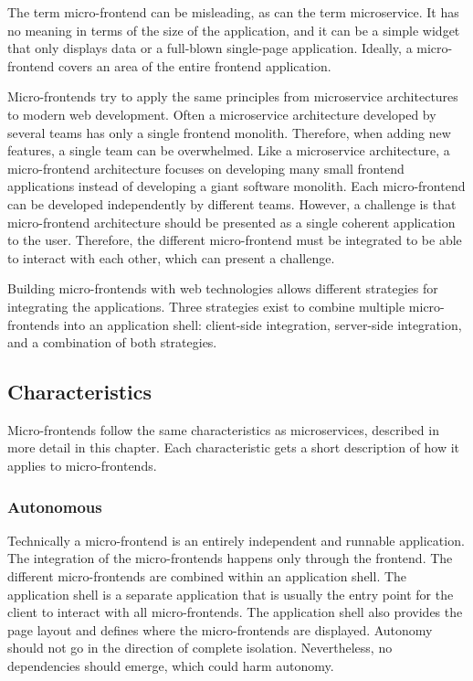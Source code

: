 \bigskip

\noindent The term micro-frontend can be misleading, as can the term microservice. It has no meaning in terms of the size of the application, and it can be a simple widget that only displays data or a full-blown single-page application. Ideally, a micro-frontend covers an area of the entire frontend application.

\bigskip

\noindent Micro-frontends try to apply the same principles from microservice architectures to modern web development. Often a microservice architecture developed by several teams has only a single frontend monolith. Therefore, when adding new features, a single team can be overwhelmed. Like a microservice architecture, a micro-frontend architecture focuses on developing many small frontend applications instead of developing a giant software monolith. Each micro-frontend can be developed independently by different teams. However, a challenge is that micro-frontend architecture should be presented as a single coherent application to the user. Therefore, the different micro-frontend must be integrated to be able to interact with each other, which can present a challenge.

\bigskip

\noindent Building micro-frontends with web technologies allows different strategies for integrating the applications. Three strategies exist to combine multiple micro-frontends into an application shell: client-side integration, server-side integration, and a combination of both strategies. \cite[10-12]{book:2020:geers:background:micro-frontends:micro-frontends-in-action}

\subsection{Characteristics}\label{subsection:background:micro-frontend-characteristics}

Micro-frontends follow the same characteristics as microservices, described in more detail in this chapter. Each characteristic gets a short description of how it applies to micro-frontends.

\subsubsection{Autonomous}\label{subsubsection:background:micro-frontend-autonomous}

Technically a micro-frontend is an entirely independent and runnable application. The integration of the micro-frontends happens only through the frontend. The different micro-frontends are combined within an application shell. The application shell is a separate application that is usually the entry point for the client to interact with all micro-frontends. The application shell also provides the page layout and defines where the micro-frontends are displayed. Autonomy should not go in the direction of complete isolation. Nevertheless, no dependencies should emerge, which could harm autonomy. \cite{book:2020:geers:background:micro-frontends:micro-frontends-in-action}

